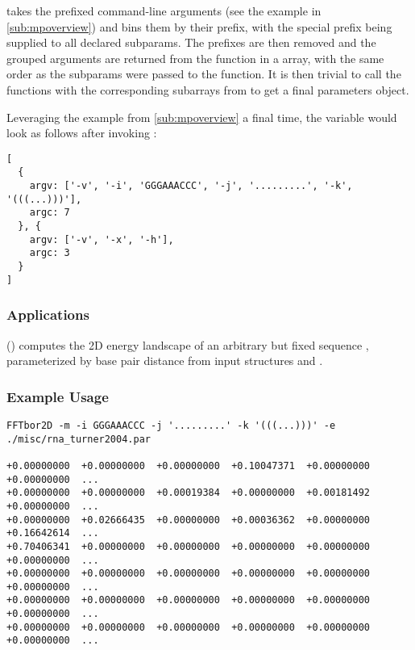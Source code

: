 \documentclass[11pt]{article}
\begin{document}
 takes the prefixed command-line arguments (see the example in \ref{sub:mpoverview}) and bins them by their prefix, with the special  prefix being supplied to all declared subparams. The prefixes are then removed and the grouped arguments are returned from the function in a  array, with the same order as the subparams were passed to the function. It is then trivial to call the  functions with the corresponding subarrays from  to get a final parameters object.

Leveraging the example from \ref{sub:mpoverview} a final time, the variable  would look as follows after invoking :
\begin{verbatim}
[
  {
    argv: ['-v', '-i', 'GGGAAACCC', '-j', '.........', '-k', '(((...)))'],
    argc: 7
  }, {
    argv: ['-v', '-x', '-h'],
    argc: 3
  }
]
\end{verbatim}



\subsubsection{Applications} \label{subsub:fftborapp}

\fft (\cite{fftTwoPaper}) computes the 2D energy landscape of an arbitrary but fixed sequence \s, parameterized by base pair distance from input structures \A and \B.

\subsubsection{Example Usage} \label{subsub:fftborex}

\begin{verbatim}
FFTbor2D -m -i GGGAAACCC -j '.........' -k '(((...)))' -e ./misc/rna_turner2004.par

+0.00000000  +0.00000000  +0.00000000  +0.10047371  +0.00000000  +0.00000000  ...
+0.00000000  +0.00000000  +0.00019384  +0.00000000  +0.00181492  +0.00000000  ...
+0.00000000  +0.02666435  +0.00000000  +0.00036362  +0.00000000  +0.16642614  ...
+0.70406341  +0.00000000  +0.00000000  +0.00000000  +0.00000000  +0.00000000  ...
+0.00000000  +0.00000000  +0.00000000  +0.00000000  +0.00000000  +0.00000000  ...
+0.00000000  +0.00000000  +0.00000000  +0.00000000  +0.00000000  +0.00000000  ...
+0.00000000  +0.00000000  +0.00000000  +0.00000000  +0.00000000  +0.00000000  ...
\end{verbatim}
\end{document}
